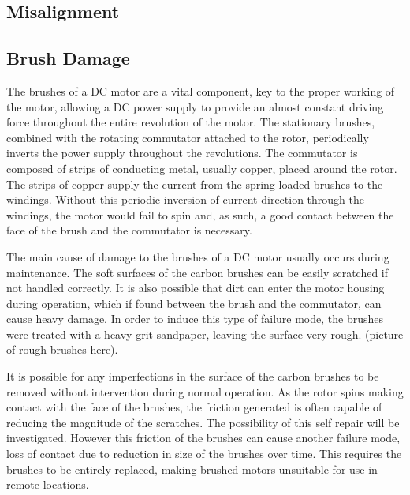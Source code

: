 \subsection{Misalignment}
\subsection{Brush Damage}
The brushes of a DC motor are a vital component, key to the proper working of the motor, allowing a DC power supply to provide an almost constant driving force throughout the entire revolution of the motor. The stationary brushes, combined with the rotating commutator attached to the rotor, periodically inverts the power supply throughout the revolutions. The commutator is composed of strips of conducting metal, usually copper, placed around the rotor. The strips of copper supply the current from the spring loaded brushes to the windings.  Without this periodic inversion of current direction through the windings, the motor would fail to spin and, as such, a good contact between the face of the brush and the commutator is necessary. 

The main cause of damage to the brushes of a DC motor usually occurs during maintenance. The soft surfaces of the carbon brushes can be easily scratched if not handled correctly. It is also possible that dirt can enter the motor housing during operation, which if found between the brush and the commutator, can cause heavy damage. In order to induce this type of failure mode, the brushes were treated with a heavy grit sandpaper, leaving the surface very rough. (picture of rough brushes here). 

It is possible for any imperfections in the surface of the carbon brushes to be removed without intervention during normal operation. As the rotor spins making contact with the face of the brushes, the friction generated is often capable of reducing the magnitude of the scratches. The possibility of this self repair will be investigated. However this friction of the brushes can cause another failure mode, loss of contact due to reduction in size of the brushes over time. This requires the brushes to be entirely replaced, making brushed motors unsuitable for use in remote locations. %


